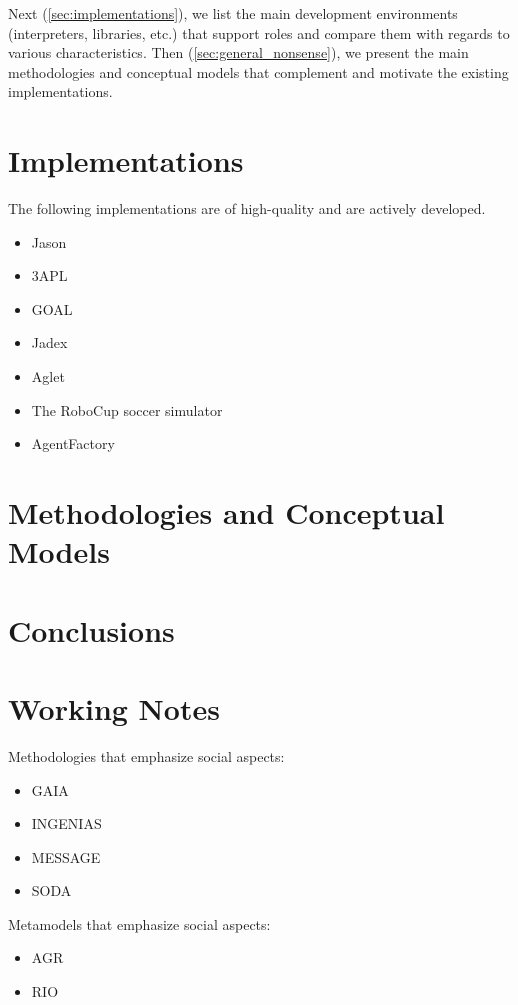 \documentclass{article}
\begin{document}
Next (\autoref{sec:implementations}), we list the main development environments (interpreters, libraries, etc.) that support roles and compare them with regards to various characteristics.
Then (\autoref{sec:general_nonsense}), we present the main methodologies and conceptual models  that complement and motivate the existing implementations.

\section{Implementations}\label{sec:implementations} %

The following implementations are of high-quality and are actively developed.
\begin{itemize}
\item Jason~\cite{books/sp/map2005/BordiniHV05}
\item 3APL~\cite{books/sp/map2005/DastaniRM05}
\item GOAL~\cite{hindriks2009programmingrationalagents}
\item Jadex~\cite{todo}
\item Aglet~\cite{todo}
\item The RoboCup soccer simulator
\item AgentFactory
\end{itemize}

\section{Methodologies and Conceptual Models}\label{sec:general_nonsense} %

\section{Conclusions}\label{sec:conclusions} %

\section{Working Notes} %
Methodologies that emphasize social aspects:
\begin{itemize}
\item GAIA~\cite{journals/aamas/WooldridgeJK00}
\item INGENIAS
\item MESSAGE
\item SODA
\end{itemize}
Metamodels that emphasize social aspects:
\begin{itemize}
\item AGR~\cite{conf/aose/FerberGM03}
\item RIO
\end{itemize}
\end{document}
